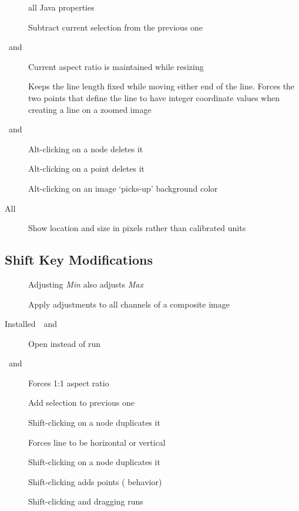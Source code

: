 \begin{description}
all Java properties
\item [{\nameref{sec:Area-selection-tools}}] Subtract current selection
from the previous one
\item [{\nameref{sub:Rectangular-Selection-Tool}\ and\ \nameref{sub:Oval-Selection-Tool}}] Current
aspect ratio is maintained while resizing
\item [{\nameref{sub:Straight-Line-Selection}}] Keeps the line length
fixed while moving either end of the line. Forces the two points that
define the line to have integer coordinate values when creating a
line on a zoomed image 
\item [{\nameref{sub:Segmented-Line-Selection}\ and\ \nameref{sub:Polygon-Selection-Tool}}] Alt-clicking
on a node deletes it 
\item [{\nameref{sec:Point-Tool}}] Alt-clicking on a point deletes it 
\item [{\nameref{sec:Color-Picker}}] Alt-clicking on an image `picks-up'
background color 
\item [{All\textsf{\ }\nameref{sec:IJ-Tools}}] Show location and size
in pixels rather than calibrated units
\end{description}

\subsection{Shift Key Modifications}
\begin{description}
\item [{}] Adjusting
\emph{Min} also adjusts \emph{Max}
\item [{}] Apply
adjustments to all channels of a composite image
\item [{Installed\ \ and\ }] Open
instead of run
\item [{\ and\ }] Forces
1:1 aspect ratio 
\item [{}] Add selection to previous
one
\item [{}] Shift-clicking on a node
duplicates it
\item [{}] Forces line to be horizontal
or vertical
\item [{}] Shift-clicking on a node
duplicates it
\item [{}] Shift-clicking adds points (
behavior)
\item [{}] Shift-clicking and dragging runs
\textsf{}
\end{description}

